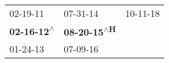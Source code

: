 \begin{supertabular}{lll}
                  02-19-11\textsuperscript{} &                    07-31-14\textsuperscript{} &  10-11-18\textsuperscript{} \\
 \textbf{02-16-12\textsuperscript{$\wedge$}} &  \textbf{08-20-15\textsuperscript{$\wedge$H}} &                             \\
                  01-24-13\textsuperscript{} &                    07-09-16\textsuperscript{} &                             \\
\end{supertabular}
